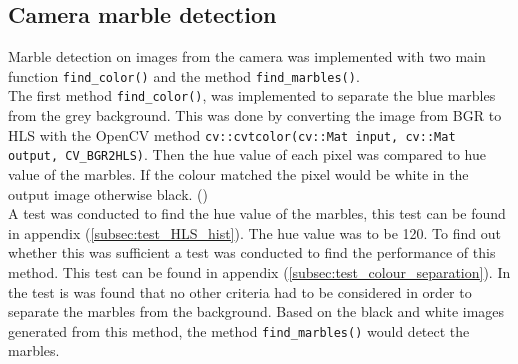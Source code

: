 \documentclass[../Head/Main.tex]{subfiles}
\begin{document}
\subsection{Camera marble detection}
Marble detection on images from the camera was implemented with two main function \texttt{find\_color()} and the method \texttt{find\_marbles()}.\\
The first method \texttt{find\_color()}, was implemented to separate the blue marbles from the grey background. This was done by converting the image from BGR to HLS with the OpenCV method \texttt{cv::cvtcolor(cv::Mat input, cv::Mat output, CV\_BGR2HLS)}. Then the hue value of each pixel was compared to hue value of the marbles. If the colour matched the pixel would be white in the output image otherwise black. (\cite[p. 18-20]{OCV})\\
A test was conducted to find the hue value of the marbles, this test can be found in appendix (\ref{subsec:test_HLS_hist}). The hue value was to be 120. To find out whether this was sufficient a test was conducted to find the performance of this method. This test can be found in appendix (\ref{subsec:test_colour_separation}). In the test is was found that no other criteria had to be considered in order to separate the marbles from the background. Based on the black and white images generated from this method, the method \texttt{find\_marbles()} would detect the marbles.\par 
\end{document}
